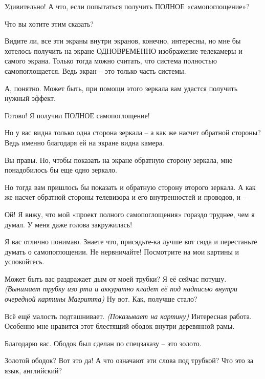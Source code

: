 \documentclass[../main.tex]{subfiles}
\begin{document}
\begin{dialogue}
 Удивительно! А что, если попытаться получить ПОЛНОЕ «самопоглощение»?

 Что вы хотите этим сказать?

 Видите ли, все эти экраны внутри экранов, конечно, интересны, но мне бы хотелось получить на экране ОДНОВРЕМЕННО изображение телекамеры и самого экрана. Только тогда можно считать, что система полностью самопоглощается. Ведь экран \--- это только часть системы.

 А, понятно. Может быть, при помощи этого зеркала вам удастся получить нужный эффект.


 Готово! Я получил ПОЛНОЕ самопоглощение!

 Но у вас видна только одна сторона зеркала \--- а как же насчет обратной стороны? Ведь именно благодаря ей на экране видна камера.

 Вы правы. Но, чтобы показать на экране обратную сторону зеркала, мне понадобилось бы еще одно зеркало.

 Но тогда вам пришлось бы показать и обратную сторону второго зеркала. А как же насчет обратной стороны телевизора и его внутренностей и проводов, и \---

 Ой! Я вижу, что мой «проект полного самопоглощения» гораздо труднее, чем я думал. У меня даже голова закружилась!

 Я вас отлично понимаю. Знаете что, присядьте-ка лучше вот сюда и перестаньте думать о самопоглощении. Не нервничайте! Посмотрите на мои картины и успокойтесь.


Может быть вас раздражает дым от моей трубки? Я её сейчас потушу. \emph{(Вынимает трубку изо рта и аккуратно кладет её под надписью внутри очередной картины Магритта)} Ну вот. Как, получше стало?

 Всё ещё малость подташнивает. \emph{(Показывает на картину)} Интересная работа. Особенно мне нравится этот блестящий ободок внутри деревянной рамы.

 Благодарю вас. Ободок был сделан по спецзаказу \--- это золото.

 Золотой ободок? Вот это да! А что означают эти слова под трубкой? Что это за язык, английский?


\end{dialogue}
\end{document}
